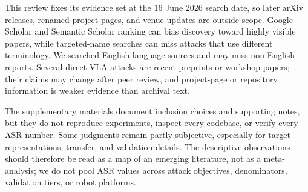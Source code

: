 This review fixes its evidence set at the 16 June 2026 search date, so later arXiv releases, renamed project pages, and venue updates are outside scope. Google Scholar and Semantic Scholar ranking can bias discovery toward highly visible papers, while targeted-name searches can miss attacks that use different terminology. We searched English-language sources and may miss non-English reports. Several direct VLA attacks are recent preprints or workshop papers; their claims may change after peer review, and project-page or repository information is weaker evidence than archival text.

The supplementary materials document inclusion choices and supporting notes, but they do not reproduce experiments, inspect every codebase, or verify every ASR number. Some judgments remain partly subjective, especially for target representations, transfer, and validation details. The descriptive observations should therefore be read as a map of an emerging literature, not as a meta-analysis; we do not pool ASR values across attack objectives, denominators, validation tiers, or robot platforms.
